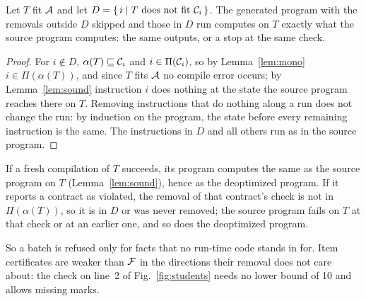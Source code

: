 \begin{theorem}\label{thm:deopt}
Let $T$ fit $\mathcal{A}$ and let $D = \{\, i \mid T \text{ does not fit } \mathcal{C}_{i} \,\}$. The generated
program with the removals outside $D$ skipped and those in $D$ run computes on $T$ exactly what the
source program computes: the same outputs, or a stop at the same check.
\end{theorem}
\begin{proof}
For $i \notin D$, $\alpha(T) \sqsubseteq \mathcal{C}_{i}$ and $i \in \Pi(\mathcal{C}_{i})$, so by
Lemma~\ref{lem:mono} $i \in \Pi(\alpha(T))$, and since $T$ fits $\mathcal{A}$ no compile error occurs; by
Lemma~\ref{lem:sound} instruction $i$ does nothing at the state the source program reaches there on
$T$. Removing instructions that do nothing along a run does not change the run: by induction on the
program, the state before every remaining instruction is the same. The instructions in $D$ and all
others run as in the source program.
\end{proof}

\begin{corollary}
If a fresh compilation of $T$ succeeds, its program computes the same as the source program on $T$
(Lemma~\ref{lem:sound}), hence as the deoptimized program. If it reports a contract as violated, the
removal of that contract's check is not in $\Pi(\alpha(T))$, so it is in $D$ or was never removed;
the source program fails on $T$ at that check or at an earlier one, and so does the deoptimized
program.
\end{corollary}

So a batch is refused only for facts that no run-time code stands in for. Item certificates are
weaker than $\mathcal{F}$ in the directions their removal does not care about: the check on line~2 of
Fig.~\ref{fig:students} needs no lower bound of 10 and allows missing marks.

